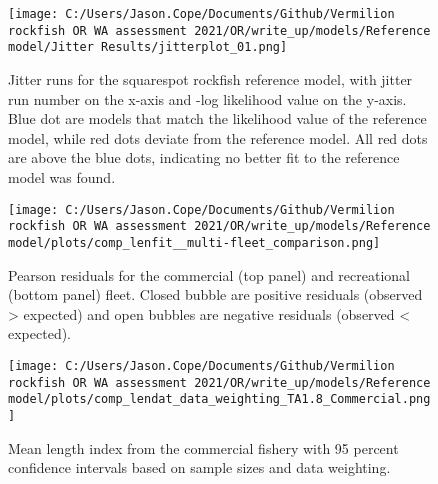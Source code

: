 \documentclass[11pt,
  english,
  a4paper,
]{article}
\begin{document}
\begin{figure}
\centering
\texttt{[image: C:/Users/Jason.Cope/Documents/Github/Vermilion rockfish OR WA assessment 2021/OR/write\_up/models/Reference model/Jitter Results/jitterplot\_01.png]}
\caption{Jitter runs for the squarespot rockfish reference model, with jitter run number on the x-axis and -log likelihood value on the y-axis. Blue dot are models that match the likelihood value of the reference model, while red dots deviate from the reference model. All red dots are above the blue dots, indicating no better fit to the reference model was found.\label{fig:jitter_01}}
\end{figure}

\tagmcend\tagstructend


\begin{figure}
\centering
\texttt{[image: C:/Users/Jason.Cope/Documents/Github/Vermilion rockfish OR WA assessment 2021/OR/write\_up/models/Reference model/plots/comp\_lenfit\_\_multi-fleet\_comparison.png]}
\caption{Pearson residuals for the commercial (top panel) and recreational (bottom panel) fleet. Closed bubble are positive residuals (observed \textgreater{} expected) and open bubbles are negative residuals (observed \textless{} expected).\label{fig:com-rec-pearson}}
\end{figure}

\tagmcend\tagstructend


\begin{figure}
\centering
\texttt{[image: C:/Users/Jason.Cope/Documents/Github/Vermilion rockfish OR WA assessment 2021/OR/write\_up/models/Reference model/plots/comp\_lendat\_data\_weighting\_TA1.8\_Commercial.png]}
\caption{Mean length index from the commercial fishery with 95 percent confidence intervals based on sample sizes and data weighting.\label{fig:com-mean-len-fit}}
\end{figure}
\end{document}
